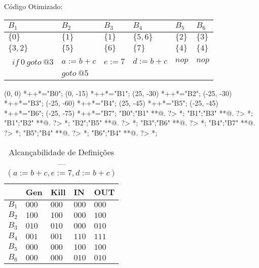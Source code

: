 C\'odigo Otimizado:

\begin{table}[ht]
\begin{scriptsize}
\begin{tabular}{l|l|l|l|l|l}
$B_{1}$ & $B_{2}$ & $B_{3}$ & $B_{4}$ & $B_{5}$ & $B_{6}$ \\
\hline
$\{0\}$ & $\{1\}$ & $\{1\}$ & $\{5, 6\}$ & $\{2\}$ & $\{3\}$ \\
$\{3, 2\}$ & $\{5\}$ & $\{6\}$ & $\{7\}$ & $\{4\}$ & $\{4\}$ \\
\hline\
$if\:0\:goto\:@3$ & $a:=b+c$ & $e:=7$ & $d:=b+c$ & $nop$ & $nop$ \\
 & $goto\:@5$ &  &  &  &  \\
\end{tabular}
\end{scriptsize}
\end{table}

\begin{scriptsize}
\xy(0, 0)
	*++{}*\frm{-,}="B0";
(0, -15)
	*++{}*\frm{-,}="B1";
(25, -30)
	*++{}*\frm{-,}="B2";
(-25, -30)
	*++{}*\frm{-,}="B3";
(-25, -60)
	*++{}*\frm{-,}="B4";
(25, -45)
	*++{}*\frm{-,}="B5";
(-25, -45)
	*++{}*\frm{-,}="B6";
(-25, -75)
	*++{}*\frm{-,}="B7";
"B0";"B1" **@{.} ?> *{\dir{>}};
"B1";"B3" **@{.} ?> *{\dir{>}};
"B1";"B2" **@{.} ?> *{\dir{>}};
"B2";"B5" **@{.} ?> *{\dir{>}};
"B3";"B6" **@{.} ?> *{\dir{>}};
"B4";"B7" **@{.} ?> *{\dir{>}};
"B5";"B4" **@{.} ?> *{\dir{>}};
"B6";"B4" **@{.} ?> *{\dir{>}};
\endxy
\end{scriptsize}


\begin{table}[ht]
\centering
\begin{tabular}{l|l|l|l|l}
	& Gen & Kill & IN & OUT\\
\hline
$B_{1}$ &  $000$ & $000$ & $000$ & $000$\\
$B_{2}$ &  $100$ & $100$ & $000$ & $100$\\
$B_{3}$ &  $010$ & $010$ & $000$ & $010$\\
$B_{4}$ &  $001$ & $001$ & $110$ & $111$\\
$B_{5}$ &  $000$ & $000$ & $100$ & $100$\\
$B_{6}$ &  $000$ & $000$ & $010$ & $010$\\
\end{tabular}
\caption{Alcan\c{c}abilidade de Defini\c{c}\~oes --- $(a:=b+c, e:=7, d:=b+c)$}
\end{table}

